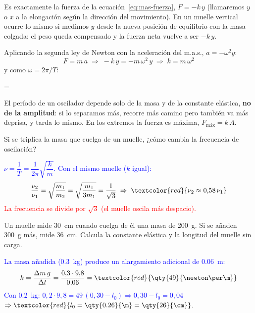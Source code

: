 Es exactamente la fuerza de la ecuación~\eqref{eq:mas-fuerza}, \(F = -k\,y\) (llamaremos \(y\) o \(x\) a la elongación según
la dirección del movimiento). En un muelle vertical ocurre lo mismo si medimos \(y\) desde la nueva posición de equilibrio
con la masa colgada: el peso queda compensado y la fuerza neta vuelve a ser \(-k\,y\).

Aplicando la segunda ley de Newton con la aceleración del m.a.s., \(a = -\omega^2 y\):
\begin{equation*}
    F = m\,a \;\Rightarrow\; -k\,y = -m\,\omega^2\,y \;\Rightarrow\; \boxed{k = m\,\omega^2}
\end{equation*}
y como \(\omega = 2\pi/T\):
\begin{centeredequation}
    \omega =  \qquad\qquad {} \label{eq:mas-periodo-muelle}
\end{centeredequation}

\begin{remark}
    El período de un oscilador depende solo de la masa y de la constante elástica, \textbf{no de la amplitud}: si lo
    separamos más, recorre más camino pero también va más deprisa, y tarda lo mismo. En los extremos la fuerza es máxima,
    \(F_{\text{máx}} = k\,A\).
\end{remark}

\begin{exercise}
    Si se triplica la masa que cuelga de un muelle, ¿cómo cambia la frecuencia de oscilación?
    \begin{solu}
        \textcolor{blue}{\(\nu = \dfrac{1}{T} = \dfrac{1}{2\pi}\sqrt{\dfrac{k}{m}}\). Con el mismo muelle (\(k\) igual):}
        \[ \dfrac{\nu_2}{\nu_1} = \sqrt{\dfrac{m_1}{m_2}} = \sqrt{\dfrac{m_1}{3m_1}} = \dfrac{1}{\sqrt 3} \;\Rightarrow\; \textcolor{red}{\nu_2 \approx 0{,}58\,\nu_1} \]
        \textcolor{red}{La frecuencia se divide por \(\sqrt 3\) (el muelle oscila más despacio).}
    \end{solu}
\end{exercise}

\begin{exercise}
    Un muelle mide \qty{30}{\cm} cuando cuelga de él una masa de \qty{200}{\g}. Si se añaden \qty{300}{\g} más, mide
    \qty{36}{\cm}. Calcula la constante elástica y la longitud del muelle sin carga.
    \begin{solu}
        \textcolor{blue}{La masa añadida (\qty{0.3}{\kg}) produce un alargamiento adicional de \qty{0.06}{\m}:}
        \[ k = \dfrac{\Delta m\,g}{\Delta l} = \dfrac{0{,}3\cdot 9{,}8}{0{,}06} = \textcolor{red}{\qty{49}{\newton\per\m}} \]
        \textcolor{blue}{Con \qty{0.2}{\kg}: \(0{,}2\cdot 9{,}8 = 49\,(0{,}30 - l_0) \Rightarrow 0{,}30 - l_0 = 0{,}04\)}
        \(\Rightarrow \textcolor{red}{l_0 = \qty{0.26}{\m} = \qty{26}{\cm}}\).
    \end{solu}
\end{exercise}

